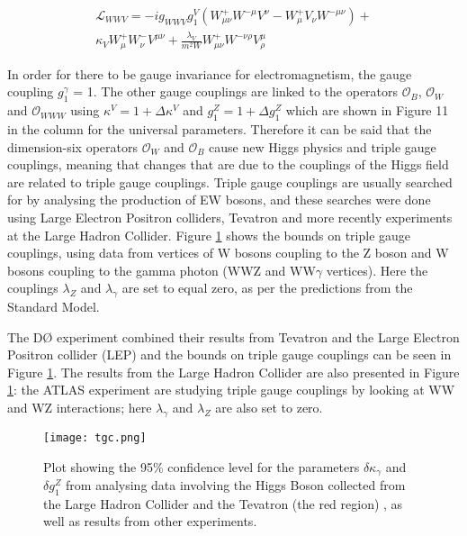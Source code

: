\documentclass[11pt,oneside,a4paper]{article}
\begin{document}
\begin{multline}
\mathcal{L}_{WWV} = -ig_{WWV}{g_{1}^{V}}(W^{+}_{\mu\nu}W^{-\mu}V^{\nu} - W^{+}_{\mu}V_{\nu}W^{-\mu\nu})+\\ \label{eq:WWV}
\kappa_{V}W^{+}_{\mu}W^{-}_{\nu}V^{\mu\nu} + \frac{\lambda_{V}}{m^{2}{W}}W^{+}_{\mu\nu}W^{-\nu\rho}V_{\rho}^{\mu}
\end{multline}

In order for there to be gauge invariance for electromagnetism, the gauge coupling $g^{\gamma}_{1}$ = 1. The other gauge couplings are linked to the operators $\mathcal{O}_{B}$, $\mathcal{O}_{W}$ and $\mathcal{O}_{WWW}$ using $\kappa^{V} = 1 + \Delta\kappa^{V}$ and $g^{Z}_{1} = 1 + \Delta g_{1}^{Z}$ which are shown in Figure 11 in the column for the universal parameters. Therefore it can be said that the dimension-six operators $\mathcal{O}_{W}$ and $\mathcal{O}_{B}$ cause new Higgs physics and triple gauge couplings, meaning that changes that are due to the couplings of the Higgs field are related to triple gauge couplings. Triple gauge couplings are usually searched for by analysing the production of EW bosons, and these searches were done using Large Electron Positron colliders, Tevatron and more recently experiments at the Large Hadron Collider. Figure \ref{fig:tgc} shows the bounds on triple gauge couplings, using data from vertices of W bosons coupling to the Z boson and W bosons coupling to the gamma photon (WWZ and WW$\gamma$ vertices). Here the couplings $\lambda_{Z}$ and $\lambda_{\gamma}$ are set to equal zero, as per the predictions from the Standard Model. 

The D{\O} experiment combined their results from Tevatron and the Large Electron Positron collider (LEP) and the bounds on triple gauge couplings can be seen in Figure \ref{fig:tgc}. The results from the Large Hadron Collider are also presented in Figure \ref{fig:tgc}: the ATLAS experiment are studying triple gauge couplings by looking at WW and WZ interactions; here $\lambda_{\gamma}$ and $\lambda_{Z}$ are also set to zero. 

\begin{figure}
\texttt{[image: tgc.png]}
\caption{Plot showing the 95\% confidence level for the parameters $\delta\kappa_{\gamma}$ and $\delta g_{1}^{Z}$ from analysing data involving the Higgs Boson collected from the Large Hadron Collider and the Tevatron (the red region) , as well as results from other experiments.}
\label{fig:tgc}
\end{figure}
\end{document}
